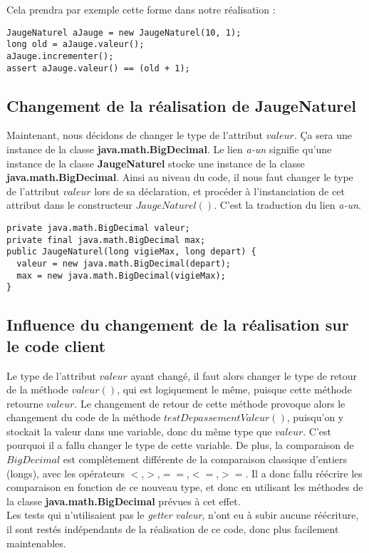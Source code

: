 \documentclass[a4paper,11pts]{article}
\begin{document}
Cela prendra par exemple cette forme dans notre réalisation :
\begin{verbatim}
JaugeNaturel aJauge = new JaugeNaturel(10, 1);
long old = aJauge.valeur();
aJauge.incrementer();
assert aJauge.valeur() == (old + 1);
\end{verbatim}

\subsection{Changement de la réalisation de JaugeNaturel}
Maintenant, nous décidons de changer le type de l'attribut $valeur$. Ça sera une instance de la classe \textbf{java.math.BigDecimal}. Le lien \textit{a-un} signifie qu'une instance de la classe \textbf{JaugeNaturel} stocke une instance de la classe \textbf{java.math.BigDecimal}. Ainsi au niveau du code, il nous faut changer le type de l'attribut $valeur$ lors de sa déclaration, et procéder à l'instanciation de cet attribut dans le constructeur $JaugeNaturel()$. C'est la traduction du lien \textit{a-un}.
\begin{verbatim}
private java.math.BigDecimal valeur;
private final java.math.BigDecimal max;
public JaugeNaturel(long vigieMax, long depart) {
  valeur = new java.math.BigDecimal(depart);
  max = new java.math.BigDecimal(vigieMax);
}
\end{verbatim}

\subsection{Influence du changement de la réalisation sur le code client}
Le type de l'attribut $valeur$ ayant changé, il faut alors changer le type de retour de la méthode $valeur()$, qui est logiquement le même, puisque cette méthode retourne $valeur$. Le changement de retour de cette méthode provoque alors le changement du code de la méthode $testDepassementValeur()$, puisqu'on y stockait la valeur dans une variable, donc du même type que $valeur$. C'est pourquoi il a fallu changer le type de cette variable. De plus, la comparaison de $BigDecimal$ est complètement différente de la comparaison classique d'entiers (longs), avec les opérateurs $<$,$>$,$==$,$<=$,$>=$. Il a donc fallu réécrire les comparaison en fonction de ce nouveau type, et donc en utilisant les méthodes de la classe \textbf{java.math.BigDecimal} prévues à cet effet.\\
Les tests qui n'utilisaient pas le \textit{getter} \textit{valeur}, n'ont eu à subir aucune réécriture, il sont restés indépendants de la réalisation de ce code, donc plus facilement maintenables.
\end{document}
